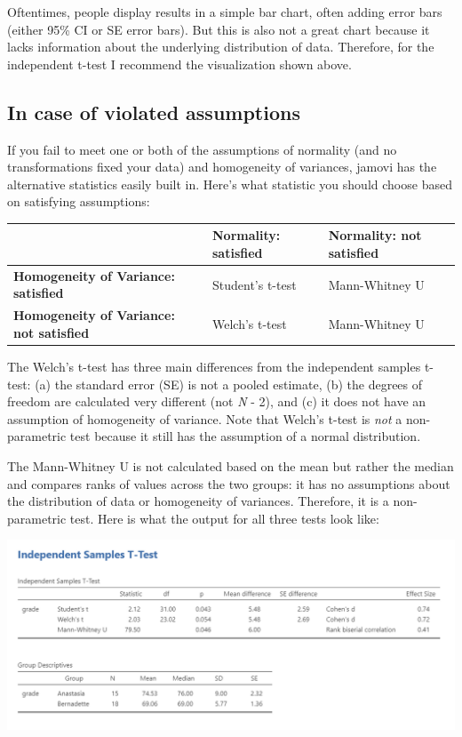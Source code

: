 \documentclass[
]{book}
\begin{document}
Oftentimes, people display results in a simple bar chart, often adding error bars (either 95\% CI or SE error bars). But this is also not a great chart because it lacks information about the underlying distribution of data. Therefore, for the independent t-test I recommend the visualization shown above.

\hypertarget{in-case-of-violated-assumptions-1}{%
\subsection{In case of violated assumptions}\label{in-case-of-violated-assumptions-1}}

If you fail to meet one or both of the assumptions of normality (and no transformations fixed your data) and homogeneity of variances, jamovi has the alternative statistics easily built in. Here's what statistic you should choose based on satisfying assumptions:

\begin{longtable}[]{@{}lll@{}}
\toprule
& \textbf{Normality: satisfied} & \textbf{Normality: not satisfied} \\
\midrule
\endhead
\textbf{Homogeneity of Variance: satisfied} & Student's t-test & Mann-Whitney U \\
\textbf{Homogeneity of Variance: not satisfied} & Welch's t-test & Mann-Whitney U \\
\bottomrule
\end{longtable}

The Welch's t-test has three main differences from the independent samples t-test: (a) the standard error (SE) is not a pooled estimate, (b) the degrees of freedom are calculated very different (not \emph{N} - 2), and (c) it does not have an assumption of homogeneity of variance. Note that Welch's t-test is \emph{not} a non-parametric test because it still has the assumption of a normal distribution.

The Mann-Whitney U is not calculated based on the mean but rather the median and compares ranks of values across the two groups: it has no assumptions about the distribution of data or homogeneity of variances. Therefore, it is a non-parametric test. Here is what the output for all three tests look like:

\includegraphics{images/02-independent_t-test/independent_t-test_full-results.png}
\end{document}
